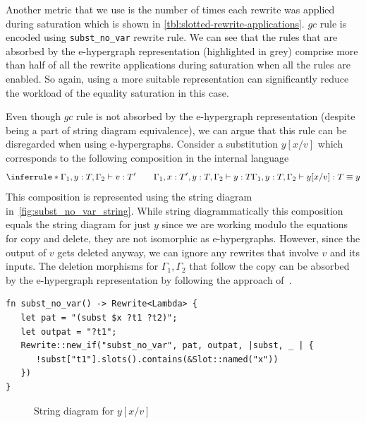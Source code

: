 Another metric that we use is the number of times each rewrite was applied during saturation which is shown in \autoref{tbl:slotted-rewrite-applications}.
$gc$ rule is encoded using \texttt{subst\_no\_var} rewrite rule.
We can see that the rules that are absorbed by the e-hypergraph representation (highlighted in grey) comprise more than half of all the rewrite applications during saturation when all the rules are enabled.
So again, using a more suitable representation can significantly reduce the workload of the equality saturation in this case.

\begin{remark}
Even though $gc$ rule is not absorbed by the e-hypergraph representation (despite being a part of string diagram equivalence), we can argue that this rule can be disregarded when using e-hypergraphs.
Consider a substitution $y[x / v]$ which corresponds to the following composition in the internal language
\[
\inferrule*{\Gamma_1,y : T, \Gamma_2 \vdash v : T' \qquad \Gamma_1, x : T', y : T, \Gamma_2 \vdash y : T}{
	\Gamma_1, y : T, \Gamma_2 \vdash y[x / v] : T \equiv y
}
\]
This composition is represented using the string diagram in~\autoref{fig:subst_no_var_string}.
While string diagrammatically this composition equals the string diagram for just $y$ since we are working modulo the equations for copy and delete, they are not isomorphic as e-hypergraphs.
However, since the output of $v$ gets deleted anyway, we can ignore any rewrites that involve $v$ and its inputs.
The deletion morphisms for $\Gamma_1, \Gamma_2$ that follow the copy can be absorbed by the e-hypergraph representation by following the approach of~\citet{zanassi_comonoid}.
\end{remark}

\begin{listing}
	\begin{verbatim}
fn subst_no_var() -> Rewrite<Lambda> {
   let pat = "(subst $x ?t1 ?t2)";
   let outpat = "?t1";
   Rewrite::new_if("subst_no_var", pat, outpat, |subst, _ | {
      !subst["t1"].slots().contains(&Slot::named("x"))
   })
}
	\end{verbatim}
	\caption{$\lambda_{\text{lsub}}$ $gc$-rule}
	\label{listing:gc_rule}
\end{listing}


\begin{figure}
	\caption{String diagram for $y[x/v]$}
	\label{fig:subst_no_var_string}
\end{figure}


